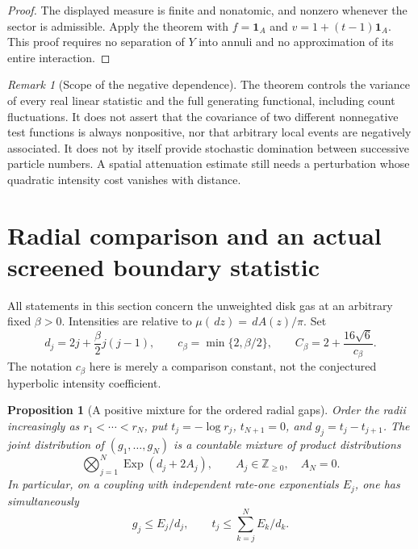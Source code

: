 \documentclass[11pt]{article}
\newcommand{\dd}{\,d}
\newtheorem{proposition}[theorem]{Proposition}
\theoremstyle{remark}\newtheorem{remark}[theorem]{Remark}
\begin{document}
\begin{proof}
The displayed measure is finite and nonatomic, and nonzero whenever
the sector is admissible.  Apply the theorem with $f=\mathbf1_A$ and
$v=1+(t-1)\mathbf1_A$.  This proof requires no separation of $Y$ into
annuli and no approximation of its entire interaction.
\end{proof}

\begin{remark}[Scope of the negative dependence]
The theorem controls the variance of every real linear statistic and
the full generating functional, including count fluctuations.  It
does not assert that the covariance of two different nonnegative
test functions is always nonpositive, nor that arbitrary local events
are negatively associated.  It does not by itself provide stochastic
domination between successive particle numbers.  A spatial attenuation
estimate still needs a perturbation whose quadratic intensity cost
vanishes with distance.
\end{remark}


\section{Radial comparison and an actual screened boundary statistic}
\label{sec:radial-comparison}

All statements in this section concern the unweighted disk gas at an
arbitrary fixed $\beta>0$. Intensities are relative to
$\mu(\dd z)=\dd A(z)/\pi$. Set
\[
 d_j=2j+\frac\beta2j(j-1),\qquad
 c_\beta=\min\{2,\beta/2\},\qquad
 C_\beta=2+\frac{16\sqrt6}{c_\beta}.
\]
The notation $c_\beta$ here is merely a comparison constant, not the
conjectured hyperbolic intensity coefficient.

\begin{proposition}[A positive mixture for the ordered radial gaps]
\label{prop:radial-positive-mixture}
Order the radii increasingly as $r_1<\cdots<r_N$, put
$t_j=-\log r_j$, $t_{N+1}=0$, and $g_j=t_j-t_{j+1}$.
The joint distribution of $(g_1,\ldots,g_N)$ is a countable mixture of
product distributions
\[
 \bigotimes_{j=1}^N\operatorname{Exp}(d_j+2A_j),
 \qquad A_j\in\mathbb Z_{\ge0},\quad A_N=0.
\]
In particular, on a coupling with independent rate-one exponentials
$E_j$, one has simultaneously
\begin{equation}\label{eq:radial-gap-domination}
 g_j\le E_j/d_j,\qquad
 t_j\le\sum_{k=j}^N E_k/d_k.
\end{equation}
\end{proposition}
\end{document}
